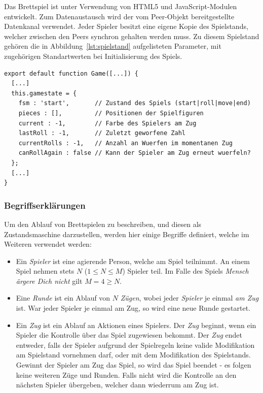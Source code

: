 Das Brettspiel ist unter Verwendung von \acf{HTML5} und JavaScript-Modulen entwickelt. Zum Datenaustausch wird der vom Peer-Objekt bereitgestellte Datenkanal verwendet. Jeder Spieler besitzt eine eigene Kopie des Spielstands, welcher zwischen den Peers synchron gehalten werden muss. Zu diesem Spielstand gehören die in Abbildung~\ref{lst:spielstand} aufgelisteten Parameter, mit zugehörigen Standartwerten bei Initialisierung des Spiels.

\vspace{5pt}
\lstset{language=js, style=STYLE_CODE_JS}
\begin{minipage}{\textwidth}
\begin{singlespace}
\begin{lstlisting}[caption={Spielstandsdaten -- Game.js}, captionpos=b, label={lst:spielstand}]
export default function Game([...]) {
  [...]
  this.gamestate = {
    fsm : 'start',       // Zustand des Spiels (start|roll|move|end)
    pieces : [],         // Positionen der Spielfiguren
    current : -1,        // Farbe des Spielers am Zug
    lastRoll : -1,       // Zuletzt geworfene Zahl
    currentRolls : -1,   // Anzahl an Wuerfen im momentanen Zug
    canRollAgain : false // Kann der Spieler am Zug erneut wuerfeln?
  };
  [...]
}
\end{lstlisting}
\end{singlespace}
\end{minipage}

\subsubsection{Begriffserklärungen}
Um den Ablauf von Brettspielen zu beschreiben, und diesen als Zustandsmaschine darzustellen, werden hier einige Begriffe definiert, welche im Weiteren verwendet werden:

\begin{itemize}
    \item Ein \textit{Spieler} ist eine agierende Person, welche am Spiel teilnimmt. An einem Spiel nehmen stets $N$ ($1 \leq N \leq M$) Spieler teil. Im Falle des Spiels \textit{Mensch ärgere Dich nicht} gilt $M = 4 \geq N$.
    
    \item Eine \textit{Runde} ist ein Ablauf von $N$ \textit{Zügen}, wobei jeder      \textit{Spieler} je einmal \textit{am Zug} ist. War jeder Spieler je einmal am Zug, so wird eine neue Runde gestartet.
    
    \item Ein \textit{Zug} ist ein Ablauf an Aktionen eines Spielers. Der \textit{Zug} beginnt, wenn ein Spieler die Kontrolle über das Spiel zugewiesen bekommt. Der \textit{Zug} endet entweder, falls der Spieler aufgrund der Spielregeln keine valide Modifikation am Spielstand vornehmen darf, oder mit dem Modifikation des Spielstands. Gewinnt der Spieler am Zug das Spiel, so wird das Spiel beendet - es folgen keine weiteren Züge und Runden. Falls nicht wird die Kontrolle an den nächsten Spieler übergeben, welcher dann wiederrum am Zug ist.
\end{itemize}

